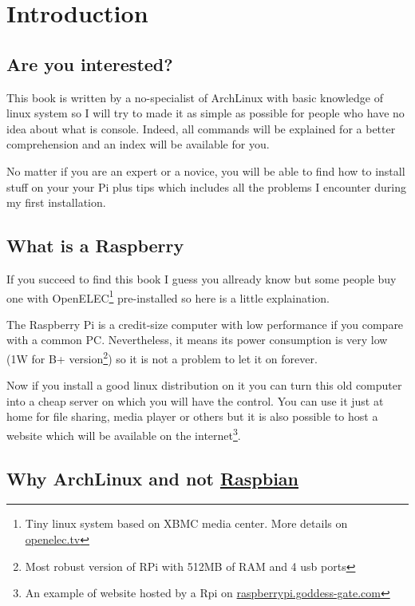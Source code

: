 \chapter{Introduction}
	\section{Are you interested?}
This book is written by a no-specialist of ArchLinux with basic knowledge of 
linux system so I will try to made it as simple as possible for people 
who have no idea about what is console. Indeed, all commands will be 
explained for a better comprehension and an index will be available for you.

No matter if you are an expert or a novice, you will be able to find 
how to install stuff on your your Pi plus tips which includes all the problems 
I encounter during my first installation.

	\section{What is a Raspberry}
If you succeed to find this book I guess you allready know but some people 
buy one with OpenELEC\footnote{Tiny linux system based on XBMC media center. 
More details on \href{http://openelec.tv}{openelec.tv}} pre-installed so here 
is a little explaination.

The Raspberry Pi is a credit-size computer with low performance if you
compare with a common PC. Nevertheless, it means its power consumption is
very low (1W for B+ version\footnote{Most robust version of RPi with 512MB 
of RAM and 4 usb ports}) so it is not a problem to let it on forever. 

Now if you install a good linux distribution on it you can turn this old computer
into a cheap server on which you will have the control. You can use it 
just at home for file sharing, media player or others but it is also possible
to host a website which will be available on the internet\footnote{An example
of website hosted by a Rpi on \href{http://raspberrypi.goddess-gate.com}
{raspberrypi.goddess-gate.com}}.

	\section{Why ArchLinux and not \href{http://www.raspbian.org}{Raspbian}}
